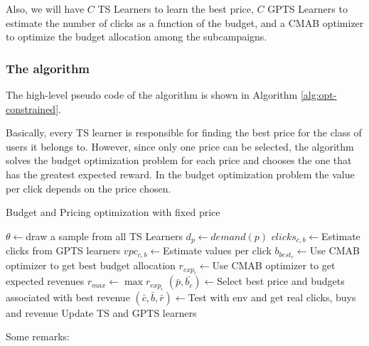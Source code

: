 Also, we will have $C$ TS Learners to learn the best price, $C$ GPTS Learners to estimate the number of clicks as a function of the budget, and a CMAB optimizer to optimize the budget allocation among the subcampaigns.

\subsubsection{The algorithm}
The high-level pseudo code of the algorithm is shown in Algorithm \ref{alg:opt-constrained}.

Basically, every TS learner is responsible for finding the best price for the class of users it belongs to.
However, since only one price can be selected, the algorithm solves the budget optimization problem for each price and chooses the one that has the greatest expected reward.
In the budget optimization problem the value per click depends on the price chosen.
\begin{algorithm}
    \caption{Budget and Pricing optimization with fixed price}
    \label{alg:opt-constrained}
	\begin{algorithmic}[1]
        \STATE $\theta\gets ${draw a sample from all TS Learners}
        \STATE $d_p \gets demand(p)$
        \STATE $clicks_{c,b} \gets${Estimate clicks from GPTS learners}
        \STATE $vpc_{c,b}\gets${Estimate values per click}
        \ENDFOR
        \STATE $b_{best_c} \gets${Use CMAB optimizer to get best budget allocation}
        \STATE $r_{exp_i} \gets${Use CMAB optimizer to get expected revenues}
        \ENDFOR
        \ENDFOR
        \STATE $r_{max} \gets \max{r_{exp_i}}$
        \STATE $(\bar{p}, \bar{b_c}) \gets${Select best price and budgets associated with best revenue}
        \STATE $(\bar{c}, \bar{b}, \bar{r}) \gets${Test with env and get real clicks, buys and revenue}
        \STATE Update TS and GPTS learners
        \ENDFOR
	\end{algorithmic}
\end{algorithm}
\newpage Some remarks:
